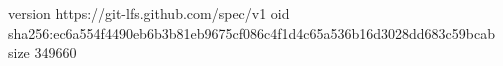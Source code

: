 version https://git-lfs.github.com/spec/v1
oid sha256:ec6a554f4490eb6b3b81eb9675cf086c4f1d4c65a536b16d3028dd683c59bcab
size 349660
